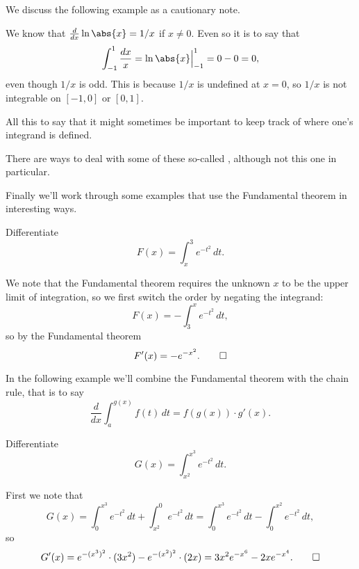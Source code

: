 \noindent
We discuss the following example as a cautionary note.

\begin{counterexample}
	We know that $\frac{d}{d x} \ln\abs{x} = 1/x$ if $x \neq 0$.
	Even so it is  to say that
	\[
		\int_{-1}^1 \frac{d x}{x} = \ln\abs{x} \Big \rvert_{-1}^1 = 0 - 0 = 0,
	\]
	even though $1/x$ is odd.
	This is because $1/x$ is undefined at $x = 0$, so $1/x$ is not integrable on $[{-1}, 0]$ or $[0, 1]$.

	All this to say that it might sometimes be important to keep track of where one's integrand is defined.

	There are ways to deal with some of these so-called , although not this one in particular.
\end{counterexample}

\noindent
Finally we'll work through some examples that use the Fundamental theorem in interesting ways.

\begin{example}
	Differentiate
	\[
		F(x) = \int_x^3 e^{-t^2} \, d t.
	\]

	\noindent
	We note that the Fundamental theorem requires the unknown $x$ to be the upper limit of integration, so we first switch the order by negating the integrand:
	\[
		F(x) = - \int_3^x e^{-t^2} \, d t,
	\]
	so by the Fundamental theorem
	\[
		F'(x) = - e^{-x^2}. \qedhere
	\]
\end{example}

\noindent
In the following example we'll combine the Fundamental theorem with the chain rule, that is to say
\[
	\frac{d}{d x} \int_a^{g(x)} f(t) \, d t = f(g(x)) \cdot g'(x).
\]

\begin{example}
	Differentiate
	\[
		G(x) = \int_{x^2}^{x^3} e^{-t^2} \, d t.
	\]

	\noindent
	First we note that
	\[
		G(x) = \int_0^{x^3} e^{-t^2} \, d t + \int_{x^2}^0 e^{-t^2} \, d t = \int_0^{x^3} e^{-t^2} \, d t - \int_0^{x^2} e^{-t^2} \, d t,
	\]
	so
	\[
		G'(x) = e^{-(x^3)^2} \cdot (3 x^2) - e^{-(x^2)^2} \cdot (2 x) = 3x^2 e^{-x^6} - 2xe^{-x^4}. \qedhere
	\]
\end{example}
